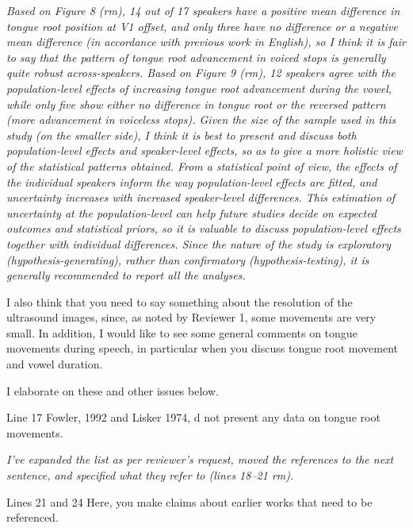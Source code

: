 \documentclass[]{article}
\begin{document}
\begin{adjustwidth}{1cm}{} \textit{
Based on Figure 8 (rm), 14 out of 17 speakers have a positive mean difference in tongue root position at V1 offset, and only three have no difference or a negative mean difference (in accordance with previous work in English), so I think it is fair to say that the pattern of tongue root advancement in voiced stops is generally quite robust across-speakers. Based on Figure 9 (rm), 12 speakers agree with the population-level effects of increasing tongue root advancement during the vowel, while only five show either no difference in tongue root or the reversed pattern (more advancement in voiceless stops).
Given the size of the sample used in this study (on the smaller side), I think it is best to present and discuss both population-level effects and speaker-level effects, so as to give a more holistic view of the statistical patterns obtained. From a statistical point of view, the effects of the individual speakers inform the way population-level effects are fitted, and uncertainty increases with increased speaker-level differences. This estimation of uncertainty at the population-level can help future studies decide on expected outcomes and statistical priors, so it is valuable to discuss population-level effects together with individual differences. Since the nature of the study is exploratory (hypothesis-generating), rather than confirmatory (hypothesis-testing), it is generally recommended to report all the analyses.
} \end{adjustwidth}

I also think that you need to say something about the resolution of the
ultrasound images, since, as noted by Reviewer 1, some movements are
very small. In addition, I would like to see some general comments on
tongue movements during speech, in particular when you discuss tongue
root movement and vowel duration.

I elaborate on these and other issues below.

Line 17 Fowler, 1992 and Lisker 1974, d not present any data on tongue
root movements.

\begin{adjustwidth}{1cm}{} \textit{
I've expanded the list as per reviewer's request, moved the references to the next sentence, and specified what they refer to (lines 18--21 rm).
} \end{adjustwidth}

Lines 21 and 24 Here, you make claims about earlier works that need to
be referenced.
\end{document}
